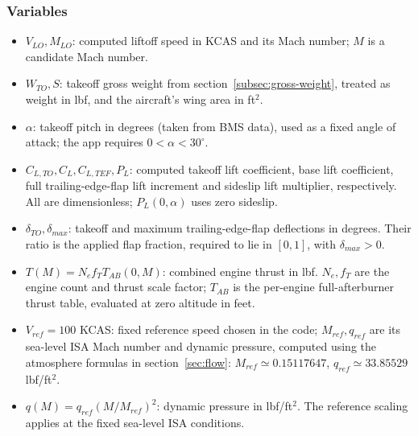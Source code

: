 \documentclass[10pt,a4paper]{amsart}
\begin{document}
\subsubsection*{Variables}
\begin{itemize}
\setlength{\itemsep}{0pt}
\setlength{\parsep}{0pt}
\item $V_{LO},M_{LO}$: computed liftoff speed in KCAS and its Mach number;
$M$ is a candidate Mach number.
\item $W_{TO},S$: takeoff gross weight from section~\ref{subsec:gross-weight}, treated as
weight in lbf, and the aircraft's wing area in ft$^2$.
\item $\alpha$: takeoff pitch in degrees (taken from BMS data), used as a
fixed angle of attack; the app requires $0<\alpha<30^\circ$.
\item $C_{L,TO},C_L,C_{L,TEF},P_L$: computed takeoff lift coefficient,
base lift coefficient, full trailing-edge-flap lift increment and
sideslip lift multiplier, respectively. All are dimensionless;
$P_L(0,\alpha)$ uses zero sideslip.
\item $\delta_{TO},\delta_{max}$: takeoff and maximum
trailing-edge-flap deflections in degrees. Their ratio is the applied
flap fraction, required to lie in $[0,1]$, with $\delta_{max}>0$.
\item $T(M)=N_e f_T T_{AB}(0,M)$: combined engine thrust in lbf.
$N_e,f_T$ are the engine count and thrust scale factor;
$T_{AB}$ is the per-engine full-afterburner thrust table, evaluated at
zero altitude in feet.
\item $V_{ref}=100$ KCAS: fixed reference speed chosen in the code;
$M_{ref},q_{ref}$ are its sea-level ISA Mach number and dynamic pressure,
computed using the atmosphere formulas in section~\ref{sec:flow}:
$M_{ref}\simeq0.15117647$, $q_{ref}\simeq33.85529$ lbf/ft$^2$.
\item $q(M)=q_{ref}(M/M_{ref})^2$: dynamic pressure in lbf/ft$^2$.
The reference scaling applies at the fixed sea-level ISA conditions.
\end{itemize}
\end{document}

